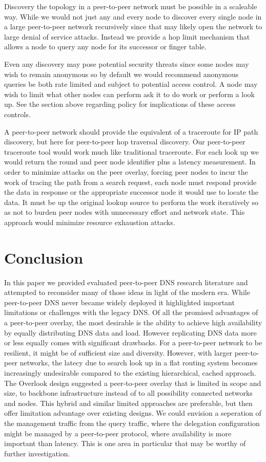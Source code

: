 \documentclass[sigconf]{acmart}
\begin{document}
Discovery the topology in a peer-to-peer network must be possible in a
scaleable way.  While we would not just any and every node to discover
every single node in a large peer-to-peer network recursively since that
may likely open the network to large denial of service attacks.  Instead
we provide a hop limit mechanism that allows a node to query any node
for its successor or finger table.

Even any discovery may pose potential security threats since some nodes
may wish to remain anonymous so by default we would recommend anonymous
queries be both rate limited and subject to potential access control.
A node may wish to limit what other nodes can perform ask it to do work
or perform a look up.  See the section above regarding policy for
implications of these access controls.

A peer-to-peer network should provide the equivalent of a traceroute for
IP path discovery, but here for peer-to-peer hop traversal discovery.
Our peer-to-peer traceroute tool would work much like traditional
traceroute.  For each look up we would return the round and peer node
identifier plus a latency measurement.  In order to minimize attacks on
the peer overlay, forcing peer nodes to incur the work of tracing the
path from a search request, each node must respond provide the data in
response or the appropriate successor node it would use to locate the
data.  It must be up the original lookup source to perform the work
iteratively so as not to burden peer nodes with unnecessary effort and
network state.  This approach would minimize resource exhaustion
attacks.

\section{Conclusion}

In this paper we provided evaluated peer-to-peer DNS research literature
and attempted to reconsider many of those ideas in light of the modern
era.  While peer-to-peer DNS never became widely deployed it highlighted
important limitations or challenges with the legacy DNS.  Of all the
promised advantages of a peer-to-peer overlay, the most desirable is the
ability to achieve high availability by equally distributing DNS data
and load.  However replicating DNS data more or less equally comes with
significant drawbacks.  For a peer-to-peer network to be resilient, it
might be of sufficient size and diversity.  However, with larger
peer-to-peer networks, the latecy due to search look up in a flat
routing system becomes increasingly undesirable compared to the existing
hierarchical, cached approach.  The Overlook design suggested a
peer-to-peer overlay that is limited in scope and size, to backbone
infrastructure instead of to all possibility connected networks and
nodes.  This hybrid and similar limited approaches are preferable, but
then offer limitation advantage over existing designs.  We could
envision a seperation of the management traffic from the query traffic,
where the delegation configuration might be managed by a peer-to-peer
protocol, where availability is more important than latency.  This is
one area in particular that may be worthy of further investigation.
\end{document}
